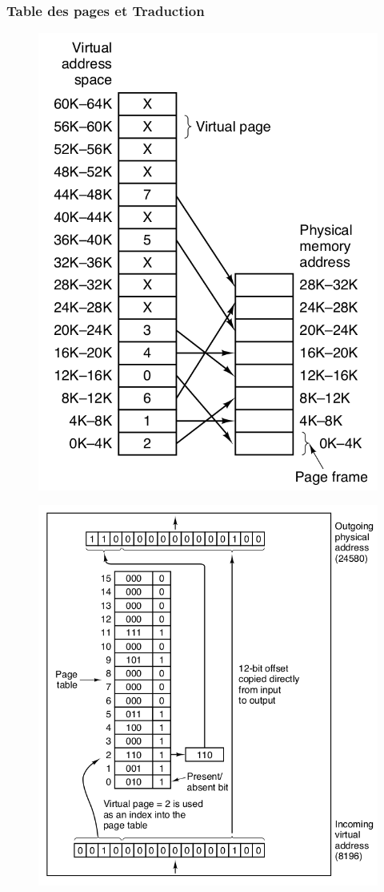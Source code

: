 \documentclass[8pt]{beamer}
\begin{document}
\begin{frame}
    \frametitle{Table des pages et Traduction}
    \begin{figure}
        \begin{minipage}[b]{0.45\linewidth}
            \centering
            \includegraphics[width=.75\linewidth]{figures/page_table_wo.png}
            \subcaption{}
            \label{fig:page_table}
        \end{minipage}
        \begin{minipage}[b]{0.5\linewidth}
            \centering
            \includegraphics[width=.75\linewidth]{figures/page_mapping.png}

\end{minipage}
\end{figure}
\end{frame}
\end{document}

